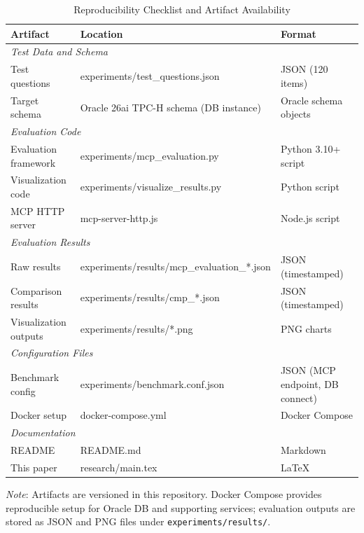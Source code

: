 \begin{table}[h]
\centering
\caption{Reproducibility Checklist and Artifact Availability}
\label{tab:reproducibility_checklist}
\footnotesize
\begin{tabular}{lll}
\toprule
\textbf{Artifact} & \textbf{Location} & \textbf{Format} \\
\midrule
\multicolumn{3}{l}{\textit{Test Data and Schema}} \\
Test questions & experiments/test\_questions.json & JSON (120 items) \\
Target schema & Oracle 26ai TPC-H schema (DB instance) & Oracle schema objects \\
\midrule
\multicolumn{3}{l}{\textit{Evaluation Code}} \\
Evaluation framework & experiments/mcp\_evaluation.py & Python 3.10+ script \\
Visualization code & experiments/visualize\_results.py & Python script \\
MCP HTTP server & mcp-server-http.js & Node.js script \\
\midrule
\multicolumn{3}{l}{\textit{Evaluation Results}} \\
Raw results & experiments/results/mcp\_evaluation\_*.json & JSON (timestamped) \\
Comparison results & experiments/results/cmp\_*.json & JSON (timestamped) \\
Visualization outputs & experiments/results/*.png & PNG charts \\
\midrule
\multicolumn{3}{l}{\textit{Configuration Files}} \\
Benchmark config & experiments/benchmark.conf.json & JSON (MCP endpoint, DB connect) \\
Docker setup & docker-compose.yml & Docker Compose \\
\midrule
\multicolumn{3}{l}{\textit{Documentation}} \\
README & README.md & Markdown \\
This paper & research/main.tex & LaTeX \\
\bottomrule
\end{tabular}

\footnotesize
\textit{Note}: Artifacts are versioned in this repository. Docker Compose provides reproducible setup for Oracle DB and supporting services; evaluation outputs are stored as JSON and PNG files under \texttt{experiments/results/}.
\end{table}
